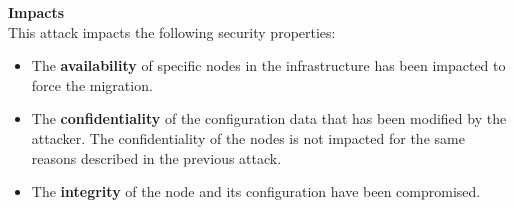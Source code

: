 \textbf{Impacts}\textbf{\\}
This attack impacts the following security properties:
\begin{itemize}
    \item The \textbf{availability} of specific nodes in the infrastructure has been impacted to force the migration.
    \item The \textbf{confidentiality} of the configuration data that has been modified by the attacker.
    The confidentiality of the nodes is not impacted for the same reasons described in the previous attack.
    \item The \textbf{integrity} of the node and its configuration have been compromised.





\end{itemize}
% 
